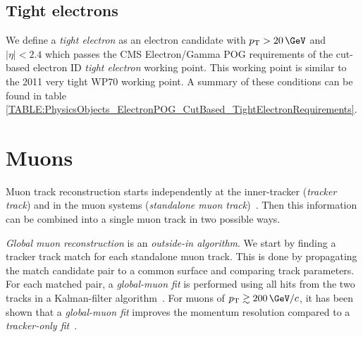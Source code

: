 

\subsection{Tight electrons}



We define a \textit{tight electron} as an electron candidate with $\pt>20\,\GeV$ and $|\eta|<2.4$ which passes the \gls{CMS} Electron/Gamma \gls{POG} requirements of the cut-based electron \gls{ID} \textit{tight electron} working point. This working point is similar to the 2011 very tight WP70 working point. A summary of these conditions can be found in table \ref{TABLE:PhysicsObjects_ElectronPOG_CutBased_TightElectronRequirements}.



\section{Muons}
\label{SECTION:EventReconstructionAndSimulation_Muons}


Muon track reconstruction starts independently at the inner-tracker (\textit{tracker track}) and in the muon systems (\textit{standalone muon track})~\cite{ARTICLE:CMSMuonReconstruction7TeV}. Then this information can be combined into a single muon track in two possible ways.

\textit{Global muon reconstruction} is an \textit{outside-in algorithm}. We start by finding a tracker track match for each standalone muon track. This is done by propagating the match candidate pair to a common surface and comparing track parameters. For each matched pair, a \textit{global-muon fit} is performed using all hits from the two tracks in a Kalman-filter algorithm~\cite{ARTICLE:KalmanFilteringTrackVertexFitting}. For muons of $\pt\gtrsim 200\,\GeV/c$, it has been shown that a \textit{global-muon fit} improves the momentum resolution compared to a \textit{tracker-only fit}~\cite{CMSTDR:CMSPhysicsVol1, ARTICLE:CMSPerformanceMuonReconstructionCosmicRay}.

